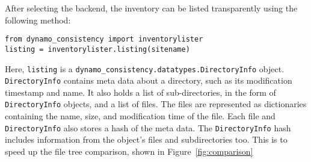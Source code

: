 After selecting the backend,
the inventory can be listed transparently using the following method:

\begin{verbatim}
from dynamo_consistency import inventorylister
listing = inventorylister.listing(sitename)
\end{verbatim}

Here, \texttt{listing} is a \texttt{dynamo\_consistency.datatypes.DirectoryInfo} object. \\
\texttt{DirectoryInfo} contains meta data about a directory,
such as its modification timestamp and name.
It also holds a list of sub-directories, in the form of \texttt{DirectoryInfo} objects,
and a list of files.
The files are represented as dictionaries containing the name, size,
and modification time of the file.
Each file and \texttt{DirectoryInfo} also stores a hash of the meta data.
The \texttt{DirectoryInfo} hash includes information from the object’s
files and subdirectories too.
This is to speed up the file tree comparison, shown in Figure~\ref{fig:comparison}


